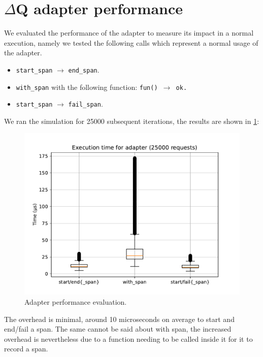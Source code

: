 \section{$\Delta$Q adapter performance}
    We evaluated the performance of the adapter to measure its impact in a normal execution, namely we tested the following calls which represent a normal usage of the adapter.
    \begin{itemize}
        \item \texttt{start\_span} $\rightarrow$ \texttt{end\_span}.
        \item \texttt{with\_span} with the following function: \texttt{fun() $\rightarrow$ ok.}
        \item \texttt{start\_span} $\rightarrow$ \texttt{fail\_span}.
    \end{itemize}

    We ran the simulation for 25000 subsequent iterations, the results are shown in \cref{fig:stub_perf}:
    \begin{figure}[H]
        \begin{center}
            \includegraphics[width=0.7\linewidth]{img/adapter.pdf}
        \end{center}
        \caption{Adapter performance evaluation.}
        \label{fig:stub_perf}
    \end{figure}

    The overhead is minimal, around 10 microseconds on average to start and end/fail a span. The same cannot be said about with span, the increased overhead is nevertheless due to a function needing to be called inside it for it to record a span. 

